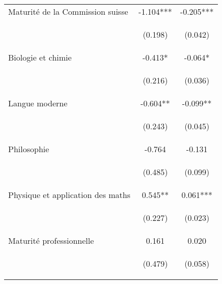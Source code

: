 \begin{center}
\begin{tabular}{lcc}
Maturité de la Commission suisse & -1.104*** & -0.205*** \\
\vspace{4pt} & \begin{footnotesize}(0.198)\end{footnotesize} & \begin{footnotesize}(0.042)\end{footnotesize} \\
Biologie et chimie & -0.413* & -0.064* \\
\vspace{4pt} & \begin{footnotesize}(0.216)\end{footnotesize} & \begin{footnotesize}(0.036)\end{footnotesize} \\
Langue moderne & -0.604** & -0.099** \\
\vspace{4pt} & \begin{footnotesize}(0.243)\end{footnotesize} & \begin{footnotesize}(0.045)\end{footnotesize} \\
Philosophie & -0.764 & -0.131 \\
\vspace{4pt} & \begin{footnotesize}(0.485)\end{footnotesize} & \begin{footnotesize}(0.099)\end{footnotesize} \\
Physique et application des maths & 0.545** & 0.061*** \\
\vspace{4pt} & \begin{footnotesize}(0.227)\end{footnotesize} & \begin{footnotesize}(0.023)\end{footnotesize} \\
Maturité professionnelle & 0.161 & 0.020 \\
\vspace{4pt} & \begin{footnotesize}(0.479)\end{footnotesize} & \begin{footnotesize}(0.058)\end{footnotesize} \\

\end{tabular}
\end{center}
